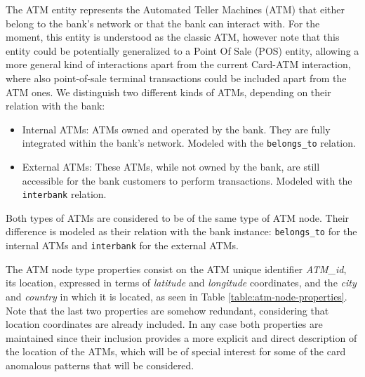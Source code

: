 


The ATM entity represents the Automated Teller Machines (ATM) that either belong to the bank's network or that the bank can interact with.
For the moment, this entity is understood as the classic ATM, however note that this entity could be potentially generalized to a Point Of Sale (POS) entity, allowing a more general kind of interactions apart from the current Card-ATM interaction, where also point-of-sale terminal transactions could be included apart from the ATM ones. 
We distinguish two different kinds of ATMs, depending on their relation with the bank:
\begin{itemize}
  \item Internal ATMs: ATMs owned and operated by the bank. They are fully integrated within the
  bank's network. Modeled with the \texttt{belongs\_to} relation.
  \item External ATMs: These ATMs, while not owned by the bank, are still accessible for the bank
  customers to perform transactions. Modeled with the \texttt{interbank} relation. 
\end{itemize}

Both types of ATMs are considered to be of the same type of ATM node. Their difference
is modeled as their relation with the bank instance: \texttt{belongs\_to} for the internal ATMs and \texttt{interbank} for the external ATMs.



The ATM node type properties consist on the ATM unique identifier \emph{ATM\_id}, its location, expressed in terms of \emph{latitude} and \emph{longitude} coordinates, and the \emph{city} and 
\emph{country} in which it is located, as seen in Table \ref{table:atm-node-properties}.
Note that the last two properties are somehow redundant, considering that location coordinates
are already included. In any case both properties are maintained since their inclusion provides a more explicit and direct description of the location of the ATMs, which will be of special interest for some of the card anomalous patterns that will be considered.\\

